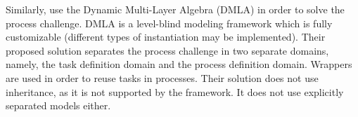 Similarly, \cite{dmla2019} use the Dynamic Multi-Layer Algebra (DMLA) \citep{dmla2017} in order to solve the process challenge. DMLA is a level-blind modeling framework which is fully customizable (\eg different types of instantiation may be implemented). Their proposed solution separates the process challenge in two separate domains, namely, the task definition domain and the process definition domain. Wrappers are used in order to reuse tasks in processes. Their solution does not use inheritance, as it is not supported by the framework. It does not use explicitly separated models either.



